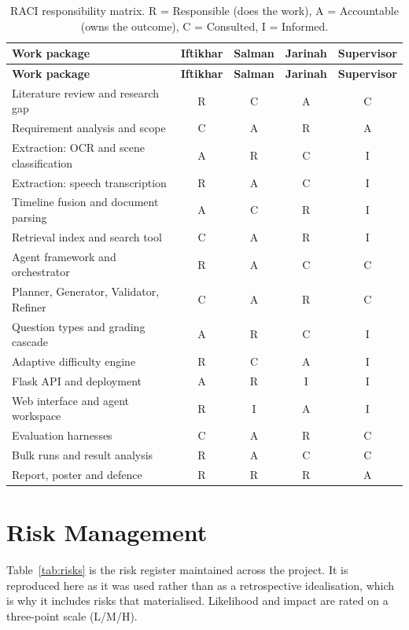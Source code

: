 {\footnotesize\singlespacing
\setlength{\tabcolsep}{5pt}
\begin{longtable}{|p{5.4cm}|c|c|c|c|}
\caption{RACI responsibility matrix. R = Responsible (does the work),
A = Accountable (owns the outcome), C = Consulted, I = Informed.}
\label{tab:raci}\\
\hline
\textbf{Work package} & \textbf{Iftikhar} & \textbf{Salman} & \textbf{Jarinah}
 & \textbf{Supervisor} \\
\hline
\endfirsthead
\hline
\textbf{Work package} & \textbf{Iftikhar} & \textbf{Salman} & \textbf{Jarinah}
 & \textbf{Supervisor} \\
\hline
\endhead
\hline
\endfoot
\hline
\endlastfoot

Literature review and research gap      & R & C & A & C \\
Requirement analysis and scope          & C & A & R & A \\
Extraction: OCR and scene classification & A & R & C & I \\
Extraction: speech transcription        & R & A & C & I \\
Timeline fusion and document parsing    & A & C & R & I \\
Retrieval index and search tool         & C & A & R & I \\
Agent framework and orchestrator        & R & A & C & C \\
Planner, Generator, Validator, Refiner  & C & A & R & C \\
Question types and grading cascade      & A & R & C & I \\
Adaptive difficulty engine              & R & C & A & I \\
Flask API and deployment                & A & R & I & I \\
Web interface and agent workspace       & R & I & A & I \\
Evaluation harnesses                    & C & A & R & C \\
Bulk runs and result analysis           & R & A & C & C \\
Report, poster and defence              & R & R & R & A \\
\hline
\end{longtable}
}

\section{Risk Management}
\label{sec:plan-risk}

Table~\ref{tab:risks} is the risk register maintained across the project. It is
reproduced here as it was used rather than as a retrospective idealisation, which is
why it includes risks that materialised. Likelihood and impact are rated on a
three-point scale (L/M/H).

